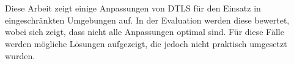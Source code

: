 \section*{\abstractname}

Diese Arbeit zeigt einige Anpassungen von DTLS für den Einsatz in eingeschränkten Umgebungen auf.
In der Evaluation werden diese bewertet, wobei sich zeigt, dass nicht alle Anpassungen optimal sind.
Für diese Fälle werden mögliche Lösungen aufgezeigt, die jedoch nicht praktisch umgesetzt wurden.